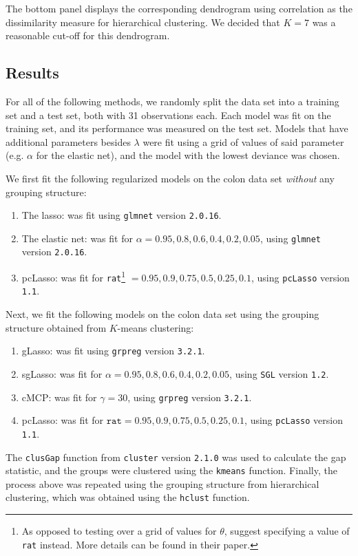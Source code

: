 \documentclass[11pt]{article}
\newcommand{\citeay}[1]{\citeauthor{#1} \citeyear{#1}}
\begin{document}
The bottom panel displays the corresponding dendrogram using correlation as the dissimilarity measure for hierarchical clustering. We decided that $K = 7$ was a reasonable cut-off for this dendrogram. 

\subsection{Results}

For all of the following methods, we randomly split the data set into a training set and a test set, both with 31 observations each. Each model was fit on the training set, and its performance was measured on the test set. Models that have additional parameters besides $\lambda$ were fit using a grid of values of said parameter (e.g. $\alpha$ for the elastic net), and the model with the lowest deviance was chosen. 

We first fit the following regularized models on the colon data set \textit{without} any grouping structure:
\begin{enumerate}
    \item The lasso: was fit using \texttt{glmnet} version \texttt{2.0.16}.
    \item The elastic net: was fit for $\alpha = 0.95, 0.8, 0.6, 0.4, 0.2, 0.05$, using \texttt{glmnet} version \texttt{2.0.16}.
    \item pcLasso: was fit for \texttt{rat}\footnote{As opposed to testing over a grid of values for $\theta$, \citeay{2018arXiv181004651T} suggest specifying a value of \texttt{rat} instead. More details can be found in their paper.} $= 0.95, 0.9, 0.75, 0.5, 0.25, 0.1$, using \texttt{pcLasso} version \texttt{1.1}.
\end{enumerate}
Next, we fit the following models on the colon data set using the grouping structure obtained from $K$-means clustering:
\begin{enumerate}
    \item gLasso: was fit using \texttt{grpreg} version \texttt{3.2.1}.
    \item sgLasso: was fit for $\alpha = 0.95, 0.8, 0.6, 0.4, 0.2, 0.05$, using \texttt{SGL} version \texttt{1.2}.
    \item cMCP: was fit for $\gamma = 30$, using \texttt{grpreg} version \texttt{3.2.1}.
    \item pcLasso: was fit for $\texttt{rat} = 0.95, 0.9, 0.75, 0.5, 0.25, 0.1$, using \texttt{pcLasso} version \texttt{1.1}.
\end{enumerate}
The \texttt{clusGap} function from \texttt{cluster} version \texttt{2.1.0} was used to calculate the gap statistic, and the groups were clustered using the \texttt{kmeans} function. Finally, the process above was repeated using the grouping structure from hierarchical clustering, which was obtained using the \texttt{hclust} function.
\end{document}
